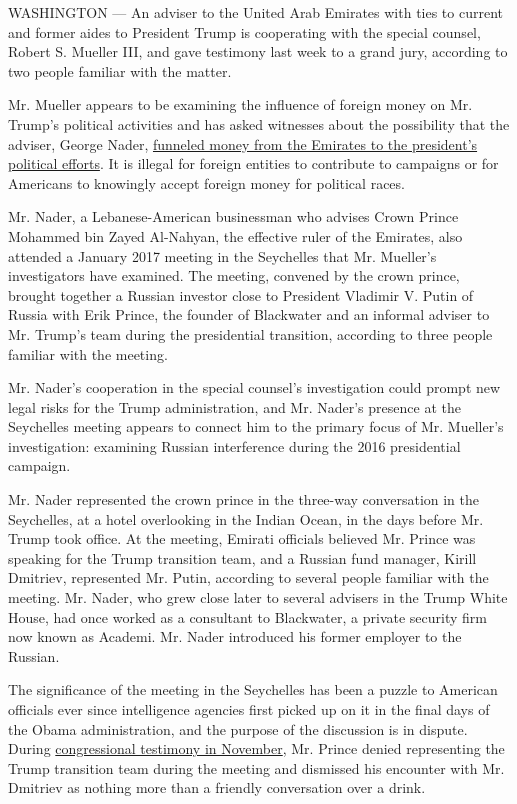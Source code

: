 WASHINGTON --- An adviser to the United Arab Emirates with ties to
current and former aides to President Trump is cooperating with the
special counsel, Robert S. Mueller III, and gave testimony last week to
a grand jury, according to two people familiar with the matter.

Mr. Mueller appears to be examining the influence of foreign money on
Mr. Trump's political activities and has asked witnesses about the
possibility that the adviser, George Nader,
\href{https://www.nytimes.com/2018/03/03/us/politics/george-nader-mueller-investigation-united-arab-emirates.html}{funneled
money from the Emirates to the president's political efforts}. It is
illegal for foreign entities to contribute to campaigns or for Americans
to knowingly accept foreign money for political races.

Mr. Nader, a Lebanese-American businessman who advises Crown Prince
Mohammed bin Zayed Al-Nahyan, the effective ruler of the Emirates, also
attended a January 2017 meeting in the Seychelles that Mr. Mueller's
investigators have examined. The meeting, convened by the crown prince,
brought together a Russian investor close to President Vladimir V. Putin
of Russia with Erik Prince, the founder of Blackwater and an informal
adviser to Mr. Trump's team during the presidential transition,
according to three people familiar with the meeting.

Mr. Nader's cooperation in the special counsel's investigation could
prompt new legal risks for the Trump administration, and Mr. Nader's
presence at the Seychelles meeting appears to connect him to the primary
focus of Mr. Mueller's investigation: examining Russian interference
during the 2016 presidential campaign.

Mr. Nader represented the crown prince in the three-way conversation in
the Seychelles, at a hotel overlooking in the Indian Ocean, in the days
before Mr. Trump took office. At the meeting, Emirati officials believed
Mr. Prince was speaking for the Trump transition team, and a Russian
fund manager, Kirill Dmitriev, represented Mr. Putin, according to
several people familiar with the meeting. Mr. Nader, who grew close
later to several advisers in the Trump White House, had once worked as a
consultant to Blackwater, a private security firm now known as Academi.
Mr. Nader introduced his former employer to the Russian.

The significance of the meeting in the Seychelles has been a puzzle to
American officials ever since intelligence agencies first picked up on
it in the final days of the Obama administration, and the purpose of the
discussion is in dispute. During
\href{http://docs.house.gov/meetings/IG/IG00/20171130/106661/HHRG-115-IG00-Transcript-20171130.pdf}{congressional
testimony in November}, Mr. Prince denied representing the Trump
transition team during the meeting and dismissed his encounter with Mr.
Dmitriev as nothing more than a friendly conversation over a drink.

